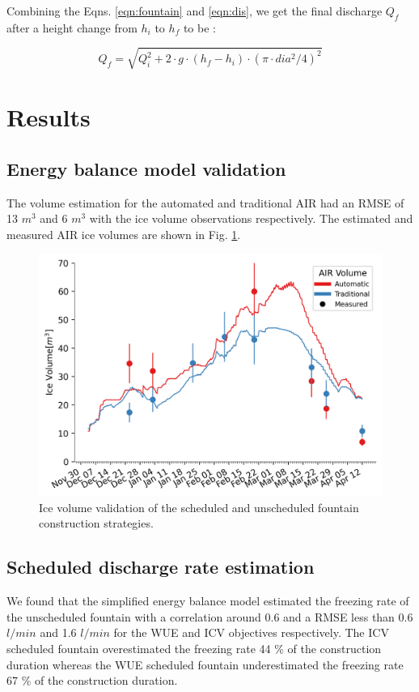 \documentclass[tc, manuscript]{copernicus}
\begin{document}
Combining the Eqns. \ref{eqn:fountain} and \ref{eqn:dis}, we get the final discharge $Q_f$ after a height change from $h_i$ to $h_f$ to be :

\begin{equation}
  \label{eqn:discharge}
  Q_f = \sqrt{Q_i^2 + 2 \cdot g \cdot (h_f-h_i) \cdot (\pi \cdot dia^2/4)^2}
\end{equation}


\section{Results}

\subsection{Energy balance model validation}

The volume estimation for the automated and traditional AIR had an RMSE of 13 $m^3$ and 6 $m^3$ with the ice
volume observations respectively. The estimated and measured AIR ice volumes are shown in Fig.
\ref{fig:validation}.
 
\begin{figure}[t] \includegraphics[width=12cm]
  {Figures/validation.png} 
  \caption{Ice volume validation of the scheduled and unscheduled fountain construction strategies.} 
\label{fig:validation} 
\end{figure}

\subsection{Scheduled discharge rate estimation}

We found that the simplified energy balance model estimated the freezing rate of the unscheduled fountain with a
correlation around 0.6 and a RMSE less than 0.6 $l/min$ and 1.6  $l/min$ for the WUE and ICV objectives
respectively. The ICV scheduled fountain overestimated the freezing rate 44 \% of the construction duration
whereas the WUE scheduled fountain underestimated the freezing rate 67 \% of the construction duration.
\end{document}
